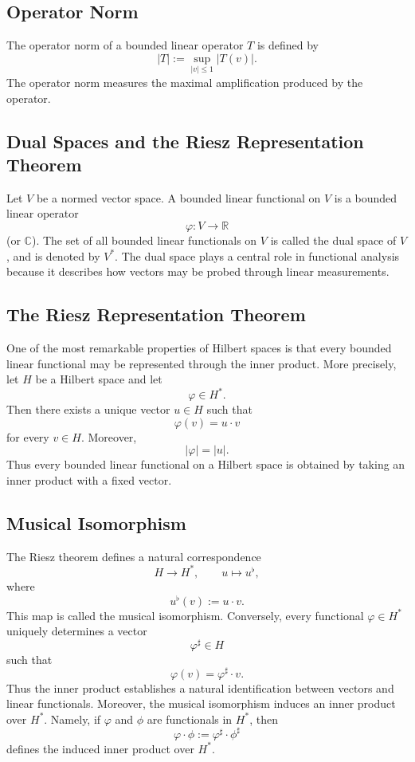 \documentclass[aps,prl,twocolumn,groupedaddress]{revtex4-2}
\begin{document}
\subsection{Operator Norm}

The operator norm of a bounded linear operator $T$ is defined by
$$
|T|
:=
\sup_{|v|\leq1}
|T(v)|.
$$
The operator norm measures the maximal amplification produced by the operator.

\subsection{Dual Spaces and the Riesz Representation Theorem}

Let $V$ be a normed vector space.
A bounded linear functional on $V$ is a bounded linear operator
$$
\varphi : V \to \mathbb{R}
$$
(or $\mathbb{C}$).
The set of all bounded linear functionals on $V$ is called the dual space of $V$, and is denoted by $V^\ast.$
The dual space plays a central role in functional analysis because it describes how vectors may be probed through linear measurements.

\subsection{The Riesz Representation Theorem}

One of the most remarkable properties of Hilbert spaces is that every bounded linear functional may be represented through the inner product.
More precisely, let $H$ be a Hilbert space and let
$$
\varphi \in H^\ast.
$$
Then there exists a unique vector $u\in H$ such that
$$
\varphi(v)=u\cdot v
$$
for every $v\in H$.
Moreover,
$$
|\varphi|
=
|u|.
$$
Thus every bounded linear functional on a Hilbert space is obtained by taking an inner product with a fixed vector.

\subsection{Musical Isomorphism}

The Riesz theorem defines a natural correspondence
$$
H
\longrightarrow
H^\ast,
\qquad
u\mapsto u^\flat,
$$
where
$$
u^\flat(v)
:=
u\cdot v.
$$
This map is called the musical isomorphism.
Conversely, every functional $\varphi\in H^\ast$ uniquely determines a vector
$$
\varphi^\sharp\in H
$$
such that
$$
\varphi(v)
=
\varphi^\sharp\cdot v.
$$
Thus the inner product establishes a natural identification between vectors and linear functionals.
Moreover, the musical isomorphism induces an inner product over $H^\ast$.
Namely, if $\varphi$ and $\phi$ are functionals in $H^\ast$, then
$$
\varphi \cdot \phi 
:= 
\varphi^\sharp \cdot \phi^\sharp 
$$
defines the induced inner product over $H^\ast$.
\end{document}
